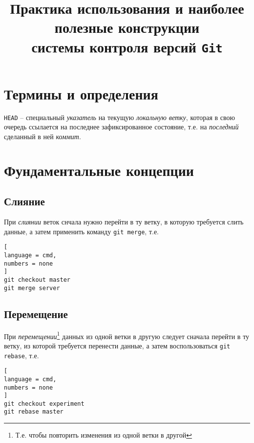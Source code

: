 \documentclass[%
	11pt,
	a4paper,
	utf8,
		]{article}
\begin{document}
\title{Практика использования и наиболее полезные конструкции\\системы контроля версий  \texttt{Git}}

\author{}

\date{}
\maketitle

\thispagestyle{fancy}

\tableofcontents


\section{Термины и определения}

\noindent\texttt{HEAD} -- специальный \textit{указатель} на текущую \emph{локальную ветку}, которая в свою очередь ссылается на последнее зафиксированное состояние, т.е. на \emph{последний} сделанный в ней \emph{коммит}. 


\section{Фундаментальные концепции}

\subsection{Слияние}

При \emph{слиянии} веток снчала нужно перейти в ту ветку, в которую требуется слить данные, а затем применить команду \texttt{git merge}, т.е.

\begin{lstlisting}[
language = cmd,
numbers = none
]
git checkout master
git merge server
\end{lstlisting}

\subsection{Перемещение}

При \emph{перемещении}\footnote{Т.е. чтобы повторить изменения из одной ветки в другой} данных из одной ветки в другую следует сначала перейти в ту ветку, из которой требуется перенести данные, а затем воспользоваться \texttt{git rebase}, т.е.

\begin{lstlisting}[
language = cmd,
numbers = none
]
git checkout experiment
git rebase master
\end{lstlisting}
\end{document}
